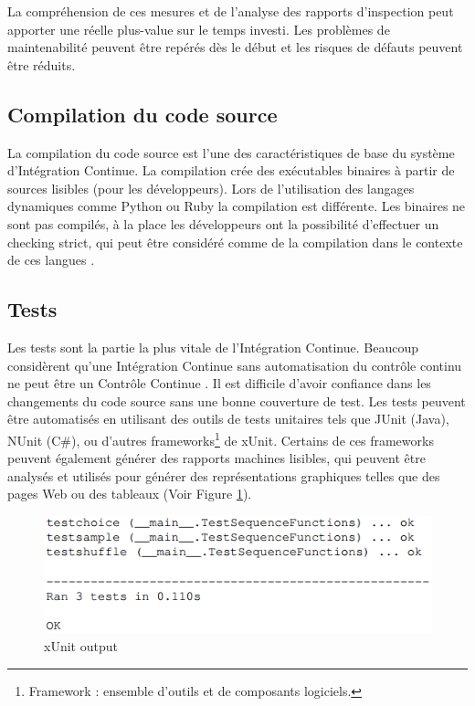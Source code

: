       La compréhension de ces mesures et de l'analyse des rapports d'inspection peut apporter une réelle plus-value sur le temps investi. Les problèmes de maintenabilité peuvent être repérés dès le début et les risques de défauts peuvent être réduits.

    \subsection{Compilation du code source}
    La compilation du code source est l'une des caractéristiques de base du système d’Intégration Continue. La compilation crée des exécutables binaires à partir de sources lisibles (pour les développeurs). Lors de l'utilisation des langages dynamiques comme Python ou Ruby la compilation est différente. Les binaires ne sont pas compilés, à la place les développeurs ont la possibilité d'effectuer un checking strict, qui peut être considéré comme de la compilation dans le contexte de ces langues \cite{Duv07}.

    \subsection{Tests}
    Les tests sont la partie la plus vitale de l’Intégration Continue. Beaucoup considèrent qu’une Intégration Continue sans automatisation du contrôle continu ne peut être un Contrôle Continue \cite{Duv07}. Il est difficile d'avoir confiance dans les changements du code source sans une bonne couverture de test. Les tests peuvent être automatisés en utilisant des outils de tests unitaires tels que JUnit (Java), NUnit (C\#), ou d'autres \gls{framework}s\footnote{Framework : ensemble d'outils et de composants logiciels.} de xUnit. Certains de ces frameworks peuvent également générer des rapports machines lisibles, qui peuvent être analysés et utilisés pour générer des représentations graphiques telles que des pages Web ou des tableaux (Voir Figure \ref{xUnit output}).

    \begin{figure}
      \begin{center}
        \includegraphics[scale=0.8]{images/tests.png}
      \end{center}
      \caption{xUnit output}
      \label{xUnit output}
    \end{figure}

